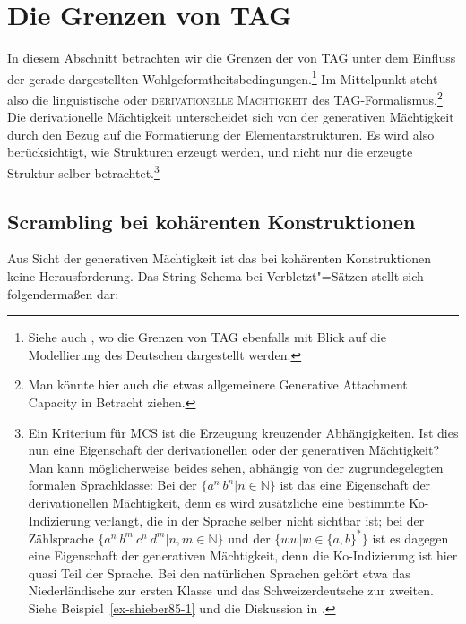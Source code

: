 \section{Die Grenzen von TAG} \label{sec-tag-grenzen}

In diesem Abschnitt betrachten wir die Grenzen der  von TAG unter dem Einfluss der gerade dargestellten Wohlgeformtheitsbedingungen.\footnote{Siehe auch \citet[Section~2.4]{Gerdes:02b}, wo die Grenzen von TAG ebenfalls mit Blick auf die Modellierung des Deutschen dargestellt werden.} Im Mittelpunkt steht also die linguistische oder \textsc{derivationelle Mächtigkeit}  \citep{Becker:Rambow:Niv:92} des TAG-Formalis\-mus.\footnote{Man könnte hier auch die etwas allgemeinere Generative Attachment Capacity \citep{Kallmeyer:06} in Betracht ziehen.} Die derivationelle Mächtigkeit unterscheidet sich von der generativen Mächtigkeit durch den Bezug auf die Formatierung der Elementarstrukturen. Es wird also berücksichtigt, wie Strukturen erzeugt werden, und nicht nur die erzeugte Struktur selber betrachtet.\footnote{Ein Kriterium für MCS ist die Erzeugung kreuzender Abhängigkeiten. Ist dies nun eine Eigenschaft der derivationellen oder der generativen Mächtigkeit? Man kann möglicherweise beides sehen, abhängig von der zugrundegelegten formalen Sprachklasse: Bei der  $\{a^n ~ b^n | n \in \mathbb{N}\}$ ist das eine Eigenschaft der derivationellen Mächtigkeit, denn es wird zusätzliche eine bestimmte Ko-Indizierung verlangt, die in der Sprache selber nicht sichtbar ist; bei der Zählsprache $\{a^n ~ b^m ~ c^n ~ d^m | n,m \in \mathbb{N}\}$ und der  $\{ww|w\in\{a,b\}^*\}$ ist es dagegen eine Eigenschaft der generativen Mächtigkeit, denn die Ko-Indizierung ist hier quasi Teil der Sprache. Bei den natürlichen Sprachen gehört etwa das Niederländische zur ersten Klasse und das Schweizerdeutsche zur zweiten. Siehe Beispiel~\ref{ex-shieber85-1} und die Diskussion in \cite{Shieber:85}.} 

\subsection{Scrambling bei kohärenten Konstruktionen} \label{sec-tag-grenzen-scram}

Aus Sicht der generativen Mächtigkeit ist das  bei kohärenten Konstruktionen keine Herausforderung. Das String-Schema bei Verbletzt"=Sätzen \linebreak stellt sich folgenderma\ss en dar:

